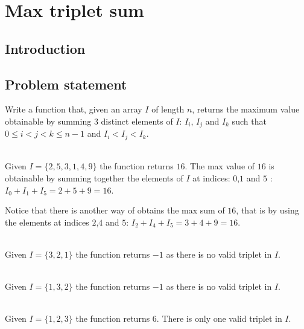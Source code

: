%



\chapter{Max triplet sum}
\label{ch:max_triplet}
\section*{Introduction}

\section{Problem statement}
\begin{exercise}
\label{example:max_triplet:exercice1}
Write a function that, given an array $I$ of length $n$, returns the maximum value obtainable by
summing $3$ distinct elements of $I$: $I_i$, $I_j$ and $I_k$ such that $ 0 \leq i < j < k \leq n-1$
and $ I_i < I_j < I_k $.


	\begin{example}
		\label{example:max_triplet:example1}
		\hfill \\
		Given $I = \{2, 5, 3, 1, 4, 9\}$ the function returns $16$. The max value of $16$ is
		obtainable by summing together the elements of $I$ at indices: $0$,$1$ and $5$ : $I_0 +
		I_1+I_5=2+5+9= 16$.
		
		Notice that there is another way of obtains the max sum of $16$, that is by using the
		elements at indices $2$,$4$ and $5$: $I_2 + I_4+I_5=3+4+9= 16$.
	\end{example}

	\begin{example}
		\label{example:max_triplet:example2}
		\hfill \\
		Given $I = \{3,2,1\}$ the function returns $-1$ as there is no valid triplet in $I$.		
	\end{example}
	
		\begin{example}
			\hfill \\
			Given $I = \{1,3,2\}$ the function returns $-1$ as there is no valid triplet in $I$.
			\label{ex:max_triplet:example2}	
		\end{example}

	\begin{example}
		\hfill \\
		Given $I = \{1,2,3\}$ the function returns $6$. There is only one valid triplet in $I$.
	\label{ex:max_triplet:example3}
	\end{example}
\end{exercise}


